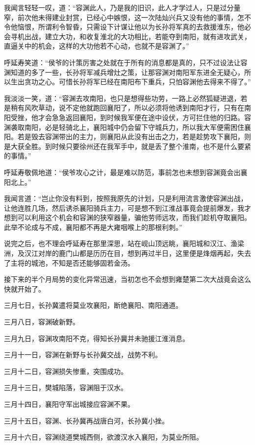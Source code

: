 我闻言轻轻一叹，道：“容渊此人，乃是我的旧识，此人才学过人，只是过分量窄，前次他未得建业封赏，已经心中嫉恨，这一次陆灿兴兵又没有他的事情，怎不令他恼恨，所谓利令智昏，只需设下计谋让他以为长孙将军真的去救援淮东，他必会寻机出战，建立大功，和收复淮北的大功相比，若能夺到南阳，就有进攻武关，直逼关中的机会，这样的大功他若不心动，也就不是容渊了。”

呼延寿笑道：“侯爷的计策厉害之处就在于所有的消息都是真的，只不过设法让容渊知道的多了一些，长孙将军减兵增灶之策，让那容渊对南阳军东进全无疑心，所以生出贪功之心。可惜长孙将军已经在南阳布下重兵，只怕容渊他去得来不得了。”

我淡淡一笑，道：“容渊去攻南阳，也只是想得些功劳，一路上必然狐疑进退，若是稍有风吹草动，说不定他就跑回襄阳了，所以必须将他诱到南阳才行，只有在南阳受挫，他才会急急返回襄阳，到时候我军便在途中设伏，方可拦住他的归路。容渊袭取南阳，必是轻骑北上，襄阳城中仍会留下守城兵力，所以我大军便需困住襄阳。若是毁去容渊带出的主力，则襄阳从此没有出击之力，若是趁势攻下襄阳，则是大获全胜。到时候只要徐州还在我军手中，就是丢了整个淮南，也不是什么要紧的事情。”

呼延寿敬佩地道：“侯爷攻心之计，最是难以防范，事前怎也未想到容渊竟会出襄阳北上。”

我闻言道：“岂止你没有料到，按照我原先的计划，只是利用流言激使容渊出战，让他连胜几场，然后诱杀襄阳骑兵主力，可是想不到江淮战事竟会提前爆发，我才想到可以利用这个机会和容渊的狭窄器量，骗他劳师远攻，而我们趁机夺取襄阳。此举不论成与不成，襄阳都不再是大雍咽喉上的那根利刺。”

说完之后，也不理会呼延寿在那里深思，站在岘山顶远眺，襄阳城和汉江、渔梁洲，及汉江对岸的鹿门山都是历历在目，想到再过半日，这里便是烽烟再起，失去了主将的城池，不知是否还能够固若金汤。

接下来的半个月局势的变化异常迅速，当初怎也不会想到雍楚第二次大战竟会这么快就开始了。

三月七日，长孙冀遣将莫业攻襄阳，断绝襄阳、南阳通道。

三月八日，容渊破新野。

三月九日，容渊攻南阳不克，得知长孙冀并未驰援江淮消息。

三月十一日，容渊在新野与长孙冀交战，战势不利。

三月十二日，容渊损失惨重，突围成功。

三月十三日，樊城陷落，容渊阻于汉水。

三月十四日，襄阳守军出城接应容渊不果。

三月十五日，容渊、长孙冀再战唐白河，长孙冀小挫。

三月十六日，容渊绕道樊城西侧，欲渡汉水入襄阳，为莫业所阻。

